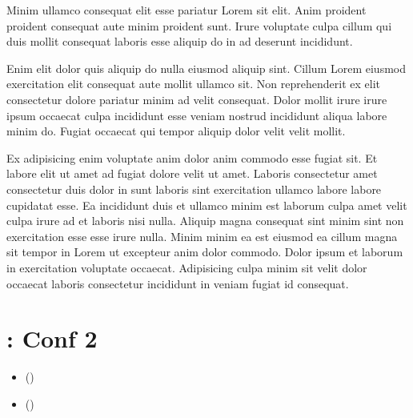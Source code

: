 \documentclass[a4paper,10pt,french]{sphinxmanual}
\begin{document}
Minim ullamco consequat elit esse pariatur Lorem sit elit. Anim proident proident consequat aute minim proident sunt. Irure voluptate culpa cillum qui duis mollit consequat laboris esse aliquip do in ad deserunt incididunt.

Enim elit dolor quis aliquip do nulla eiusmod aliquip sint. Cillum Lorem eiusmod exercitation elit consequat aute mollit ullamco sit. Non reprehenderit ex elit consectetur dolore pariatur minim ad velit consequat. Dolor mollit irure irure ipsum occaecat culpa incididunt esse veniam nostrud incididunt aliqua labore minim do. Fugiat occaecat qui tempor aliquip dolor velit velit mollit.

Ex adipisicing enim voluptate anim dolor anim commodo esse fugiat sit. Et labore elit ut amet ad fugiat dolore velit ut amet. Laboris consectetur amet consectetur duis dolor in sunt laboris sint exercitation ullamco labore labore cupidatat esse. Ea incididunt duis et ullamco minim est laborum culpa amet velit culpa irure ad et laboris nisi nulla. Aliquip magna consequat sint minim sint non exercitation esse esse irure nulla. Minim minim ea est eiusmod ea cillum magna sit tempor in Lorem ut excepteur anim dolor commodo. Dolor ipsum et laborum in exercitation voluptate occaecat. Adipisicing culpa minim sit velit dolor occaecat laboris consectetur incididunt in veniam fugiat id consequat.


\section{ : Conf 2}
\label{\detokenize{docs/refs/config/config-2::doc}}\label{\detokenize{docs/refs/config/config-2:autodesk}}\label{\detokenize{docs/refs/config/config-2:acad-conf-2}}

\begin{sphinxShadowBox}
\begin{itemize}
\item {} 
\label{\detokenize{docs/refs/config/config-2:id1}}{\hyperref[\detokenize{docs/refs/config/config-2:aide-integree}]{}} ()

\item {} 
\label{\detokenize{docs/refs/config/config-2:id2}}{\hyperref[\detokenize{docs/refs/config/config-2:aide-en-ligne-internet}]{}} ()

\end{itemize}
\end{sphinxShadowBox}
\end{document}
